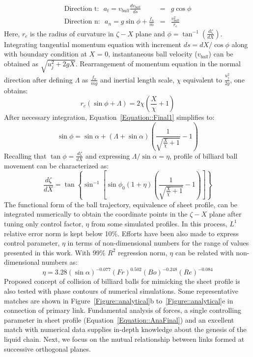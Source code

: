 \documentclass{jfm}
\begin{document}
\begin{subequations}
	\label{Equation::forceBal}	
	\begin{eqnarray}
	\label{Equation::tangential(a)}
	\text{Direction t:}\:\:\: a_t = v_{ball}\frac{dv_{ball}}{ds} &=& g\cos\phi\\
	\text{Direction n:}\:\:\: a_n = g\sin\phi + \frac{f_n}{m} &=& \frac{v_{ball}^2}{r_c}
	\end{eqnarray}
\end{subequations}
Here, $r_c$ is the radius of curvature in $\zeta-X$ plane and $\phi = \tan^{-1}\left(\frac{d\zeta}{dX}\right)$. Integrating tangential momentum equation with increment $ds = dX/\cos\phi$ along with boundary condition at $X$ = 0, instantaneous ball velocity ($v_{ball}$) can be obtained as $\sqrt{u_j^2 + 2gX}$. Rearrangement of momentum equation in the normal direction after defining $\Lambda$ as $\frac{f_n}{mg}$ and inertial length scale, $\chi$ equivalent to $\frac{u_j^2}{2g}$, one obtains:
\begin{equation}\label{Equation::Final1}
r_c\left(\sin\phi + \Lambda\right) = 2\chi\left(\frac{X}{\chi} + 1\right)
\end{equation} 
After necessary integration, Equation~\ref{Equation::Final1} simplifies to:
\begin{equation}
\sin\phi  = \sin\alpha + \left(\Lambda + \sin\alpha\right)\left(\frac{1}{\sqrt{\frac{X}{\chi} + 1}} - 1\right)	
\end{equation}
Recalling that $\tan\phi = \frac{d\zeta}{dX}$ and expressing $\Lambda/\sin\alpha = \eta$, profile of billiard ball movement can be characterized as:
\begin{equation}
\label{Equation::AnaFinal}
\frac{d\zeta}{dX} = \tan\left\lbrace\sin^{-1}\left[ \sin\phi_0\left(1 + \eta\right)\left(\frac{1}{\sqrt{\frac{X}{\chi} + 1}} - 1\right) \right]\right\rbrace
\end{equation}
The functional form of the ball trajectory, equivalence of sheet profile, can be integrated numerically to obtain the coordinate points in the $\zeta-X$ plane after tuning only control factor, $\eta$ from some simulated profiles. In this process, $L^1$ relative error norm is kept below 10\%. Efforts have been also made to express control parameter, $\eta$ in terms of non-dimensional numbers for the range of values presented in this work. With 99\% $R^2$ regression norm, $\eta$ can be related with non-dimensional numbers as:
\begin{equation}\label{Equation::eta}
\eta = 3.28(\sin\alpha)^{-0.077}(Fr)^{0.502}(Bo)^{-0.248}\left(Re\right)^{-0.084}
\end{equation}
Proposed concept of collision of billiard balls for mimicking the sheet profile is also tested with phase contours of numerical simulations. Some representative matches are shown in Figure~\ref{Figure::analytical}b to~\ref{Figure::analytical}e in connection of primary link. Fundamental analysis of forces, a single controlling parameter in sheet profile (Equation~\ref{Equation::AnaFinal}) and an excellent match with numerical data supplies in-depth knowledge about the genesis of the liquid chain. Next, we focus on the mutual relationship between links formed at successive orthogonal planes. 
\end{document}
